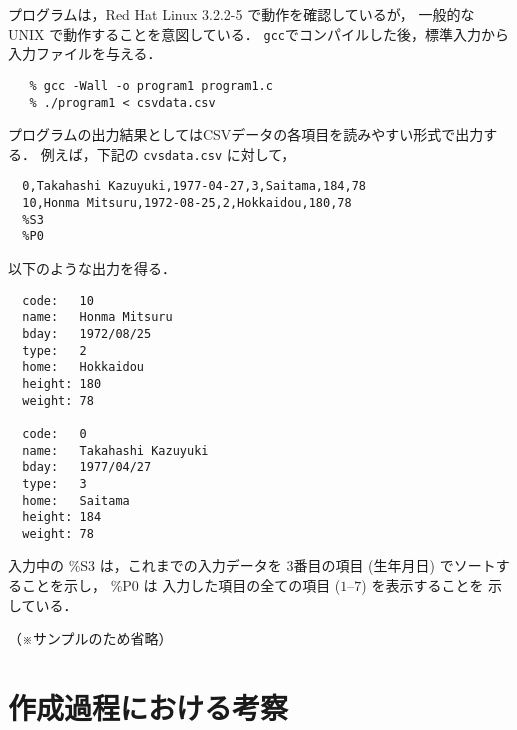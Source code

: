 \documentclass[a4j,11pt]{jarticle}
\begin{document}
プログラムは，Red Hat Linux 3.2.2-5 で動作を確認しているが，
一般的な UNIX で動作することを意図している．
\verb|gcc|でコンパイルした後，標準入力から入力ファイルを与える．

{\fontsize{10pt}{11pt} \selectfont
 \begin{verbatim}
   % gcc -Wall -o program1 program1.c
   % ./program1 < csvdata.csv
 \end{verbatim}
}

プログラムの出力結果としてはCSVデータの各項目を読みやすい形式で出力する．
例えば，下記の \verb|cvsdata.csv| に対して，

{\fontsize{10pt}{11pt} \selectfont
 \begin{verbatim}
  0,Takahashi Kazuyuki,1977-04-27,3,Saitama,184,78
  10,Honma Mitsuru,1972-08-25,2,Hokkaidou,180,78
  %S3
  %P0
 \end{verbatim}
}

\noindent %
以下のような出力を得る．

{\fontsize{10pt}{11pt} \selectfont
 \begin{verbatim}
  code:   10
  name:   Honma Mitsuru
  bday:   1972/08/25
  type:   2
  home:   Hokkaidou
  height: 180
  weight: 78

  code:   0
  name:   Takahashi Kazuyuki
  bday:   1977/04/27
  type:   3
  home:   Saitama
  height: 184
  weight: 78
 \end{verbatim}
}

\noindent
入力中の
\%S3 は，これまでの入力データを
3番目の項目 (生年月日) でソートすることを示し，
\%P0 は 入力した項目の全ての項目 ($1$--$7$) を表示することを
示している．

（※サンプルのため省略）

\section{作成過程における考察}

\end{document}
